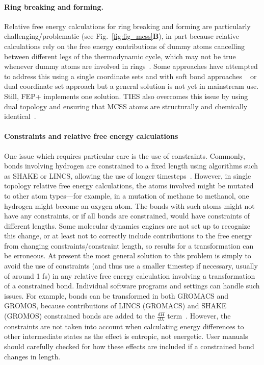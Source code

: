 \documentclass[9pt,bestpractices]{livecoms}
\begin{document}
\paragraph{Ring breaking and forming.} \label{subsec: Ring breaking and forming}
Relative free energy calculations for ring breaking and forming are particularly challenging/problematic (see Fig.~\ref{fig:fig_mcss}\textbf{B}), in part because relative calculations rely on the free energy contributions of dummy atoms cancelling between different legs of the thermodynamic cycle, which may not be true whenever dummy atoms are involved in rings~\cite{liu2015ring}.
Some approaches have attempted to address this using a single coordinate sets and with soft bond approaches ~\cite{clark2019relative,wang2017accurate} or dual coordinate set approach \cite{jespers2019qligfep, ries2022relative} but a general solution is not yet in mainstream use. Still, FEP+ implements one solution\cite{wang2017accurate}.
TIES also overcomes this issue by using dual topology and ensuring that MCSS atoms are structurally and chemically identical~\cite{bhati2017}.

\paragraph{Constraints and relative free energy calculations}
One issue which requires particular care is the use of constraints.
Commonly, bonds involving hydrogen are constrained to a fixed length using algorithms such as SHAKE or LINCS, allowing the use of longer timesteps~\cite{krautler2001fast}.
However, in single topology relative free energy calculations, the atoms involved might be mutated to other atom types---for example, in a mutation of methane to methanol, one hydrogen might become an oxygen atom. The bonds with such atoms might not have any constraints, or if all bonds are constrained, would have constraints of different lengths. 
Some molecular dynamics engines are not set up to recognize this change, or at least not to correctly include contributions to the free energy from changing constraints/constraint length, so results for a transformation can be erroneous.
At present the most general solution to this problem is simply to avoid the use of constraints (and thus use a smaller timestep if necessary, usually of around 1 fs) in any relative free energy calculation involving a transformation of a constrained bond. Individual software programs and settings can handle such issues. For example, bonds can be transformed in both GROMACS and GROMOS, because contributions of LINCS (GROMACS) and SHAKE (GROMOS) constrained bonds are added to the $\frac{dH}{d\lambda}$ term~\cite{pearlman1993determining, straatsma1992holonomic, pearlman1991overlooked, gunsteren1989computer}. However, the constraints are not taken into account when calculating energy differences to other intermediate states as the effect is entropic, not energetic. User manuals should carefully checked for how these effects are included if a constrained bond changes in length. 
\end{document}
